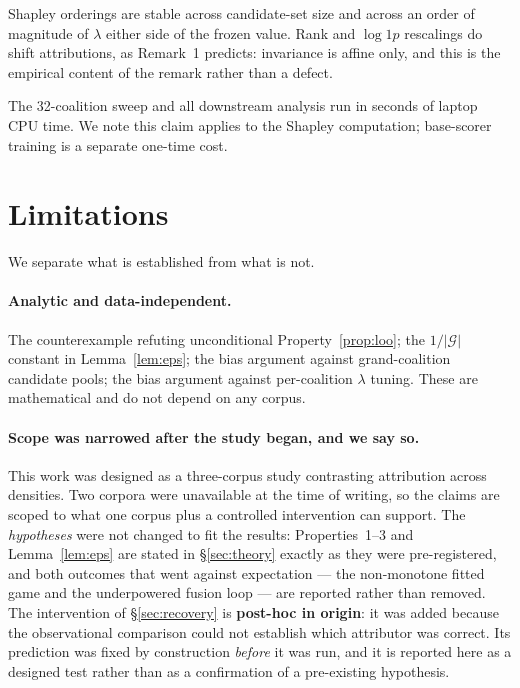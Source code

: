 \documentclass[11pt]{article}
\newcommand{\G}{\mathcal{G}}
\begin{document}


Shapley orderings are stable across candidate-set size and across an order of
magnitude of $\lambda$ either side of the frozen value. Rank and $\log 1p$
rescalings do shift attributions, as Remark~1 predicts: invariance is affine
only, and this is the empirical content of the remark rather than a defect.



The 32-coalition sweep and all downstream analysis run in seconds of laptop CPU
time. We note this claim applies to the Shapley computation; base-scorer
training is a separate one-time cost.

\section{Limitations}\label{sec:limitations}

We separate what is established from what is not.

\paragraph{Analytic and data-independent.} The counterexample refuting
unconditional Property~\ref{prop:loo}; the $1/|\G|$ constant in
Lemma~\ref{lem:eps}; the bias argument against grand-coalition candidate pools;
the bias argument against per-coalition $\lambda$ tuning. These are
mathematical and do not depend on any corpus.

\paragraph{Scope was narrowed after the study began, and we say so.}
This work was designed as a three-corpus study contrasting attribution across
densities. Two corpora were unavailable at the time of writing, so the claims
are scoped to what one corpus plus a controlled intervention can support. The
\emph{hypotheses} were not changed to fit the results: Properties~1--3 and
Lemma~\ref{lem:eps} are stated in \S\ref{sec:theory} exactly as they were
pre-registered, and both outcomes that went against expectation --- the
non-monotone fitted game and the underpowered fusion loop --- are reported
rather than removed. The intervention of \S\ref{sec:recovery} is
\textbf{post-hoc in origin}: it was added because the observational comparison
could not establish which attributor was correct. Its prediction was fixed by
construction \emph{before} it was run, and it is reported here as a designed
test rather than as a confirmation of a pre-existing hypothesis.
\end{document}
